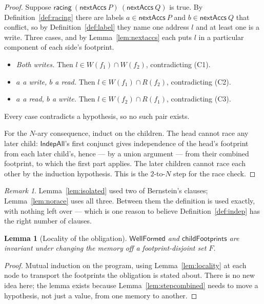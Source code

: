 \documentclass[11pt,a4paper]{article}
\theoremstyle{definition}
\theoremstyle{plain}
\newtheorem{lemma}[definition]{Lemma}
\theoremstyle{remark}
\newtheorem{remark}[definition]{Remark}
\newcommand{\reads}[1]{R(#1)}
\newcommand{\writes}[1]{W(#1)}
\newcommand{\wf}{\mathsf{WellFormed}}
\begin{document}
\begin{proof}
Suppose $\mathsf{racing}\ (\mathsf{nextAccs}\ P)\ (\mathsf{nextAccs}\ Q)$ is true. By
Definition~\ref{def:racing} there are labels $a \in \mathsf{nextAccs}\ P$ and
$b \in \mathsf{nextAccs}\ Q$ that conflict, so by Definition~\ref{def:label} they name one
address $l$ and at least one is a write. Three cases, and by Lemma~\ref{lem:nextaccs} each
puts $l$ in a particular component of each side's footprint.
\begin{itemize}[leftmargin=1.6em,itemsep=1pt]
\item \emph{Both writes.} Then $l \in \writes{f_1} \cap \writes{f_2}$, contradicting (C1).
\item \emph{$a$ a write, $b$ a read.} Then $l \in \writes{f_1} \cap \reads{f_2}$, contradicting (C2).
\item \emph{$a$ a read, $b$ a write.} Then $l \in \writes{f_2} \cap \reads{f_1}$, contradicting (C3).
\end{itemize}
Every case contradicts a hypothesis, so no such pair exists.

For the $N$-ary consequence, induct on the children. The head cannot race any later child:
$\mathsf{IndepAll}$'s first conjunct gives independence of the head's footprint from each
later child's, hence --- by a union argument --- from their combined footprint, to which the
first part applies. The later children cannot race each other by the induction hypothesis.
This is the $2$-to-$N$ step for the race check.
\end{proof}

\begin{remark}
Lemma~\ref{lem:isolated} used two of Bernstein's clauses; Lemma~\ref{lem:norace} uses all
three. Between them the definition is used exactly, with nothing left over --- which is one
reason to believe Definition~\ref{def:indep} has the right number of clauses.
\end{remark}

\begin{lemma}[Locality of the obligation]\label{lem:wflocality}
$\wf$ and $\mathsf{childFootprints}$ are invariant under changing the memory off a
footprint-disjoint set $F$.
\end{lemma}

\begin{proof}
Mutual induction on the program, using Lemma~\ref{lem:locality} at each node to transport
the footprints the obligation is stated about. There is no new idea here; the lemma exists
because Lemma~\ref{lem:stepcombined} needs to move a hypothesis, not just a value, from one
memory to another.
\end{proof}
\end{document}
